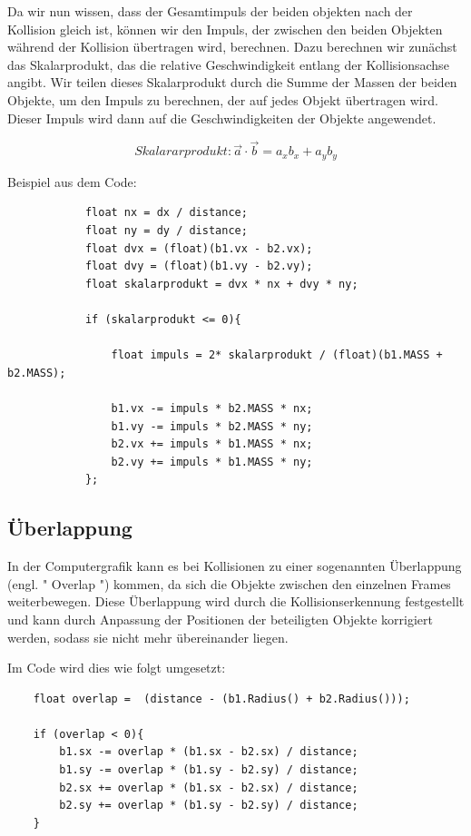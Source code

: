 \documentclass[12pt,a4paper]{article}
\begin{document}
		
		Da wir nun wissen, dass der Gesamtimpuls der beiden objekten nach der Kollision gleich ist, können wir den Impuls, der zwischen den beiden Objekten während der Kollision übertragen wird, berechnen. Dazu berechnen wir zunächst das Skalarprodukt, das die relative Geschwindigkeit entlang der Kollisionsachse angibt. Wir teilen dieses Skalarprodukt durch die Summe der Massen der beiden Objekte, um den Impuls zu berechnen, der auf jedes Objekt übertragen wird. Dieser Impuls wird dann auf die Geschwindigkeiten der Objekte angewendet.
		
		 \[Skalararprodukt:
		\vec{a} \cdot \vec{b} = a_x b_x + a_y b_y 
		\]
		
Beispiel aus dem Code:

		\begin{verbatim}
			float nx = dx / distance;
			float ny = dy / distance;
			float dvx = (float)(b1.vx - b2.vx);
			float dvy = (float)(b1.vy - b2.vy);
			float skalarprodukt = dvx * nx + dvy * ny;
			
			if (skalarprodukt <= 0){
				
				float impuls = 2* skalarprodukt / (float)(b1.MASS + b2.MASS);
				
				b1.vx -= impuls * b2.MASS * nx;
				b1.vy -= impuls * b2.MASS * ny;
				b2.vx += impuls * b1.MASS * nx;
				b2.vy += impuls * b1.MASS * ny;
			};
		\end{verbatim}
		
		
		\subsection{Überlappung}
		
In der Computergrafik kann es bei Kollisionen zu einer sogenannten Überlappung (engl. " Overlap ") kommen, da sich die Objekte zwischen den einzelnen Frames weiterbewegen. Diese Überlappung wird durch die Kollisionserkennung festgestellt und kann durch Anpassung der Positionen der beteiligten Objekte korrigiert werden, sodass sie nicht mehr übereinander liegen.
	\vspace{0.5cm}
		
Im Code wird dies wie folgt umgesetzt:
\begin{verbatim}
    float overlap =  (distance - (b1.Radius() + b2.Radius()));
    
    if (overlap < 0){
    	b1.sx -= overlap * (b1.sx - b2.sx) / distance;
    	b1.sy -= overlap * (b1.sy - b2.sy) / distance;
    	b2.sx += overlap * (b1.sx - b2.sx) / distance;
    	b2.sy += overlap * (b1.sy - b2.sy) / distance;
    }
\end{verbatim}
		
\end{document}
